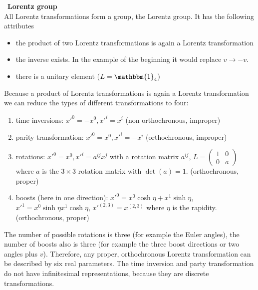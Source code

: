 \documentclass{include/thesisclass}
\newcommand{\df}{\rightarrow}
\newcommand{\ehm}{\mathbbm{1}}
\newcommand{\Matz}[4]{\begin{pmatrix}#1&#2\\#3&#4\end{pmatrix}}
\newcommand{\sub}[1]{~\newline\newline\textbf{#1}\\}
\begin{document}
\sub{Lorentz group}
All Lorentz transformations form a group, the Lorentz group. It has the following attributes
\begin{itemize}
\item the product of two Lorentz transformations is again a Lorentz transformation
\item the inverse exists. In the example of the beginning it would replace $v \df -v$.
\item there is a unitary element ($L = \ehm_4$)
\end{itemize}
Because a product of Lorentz transformations is again a Lorentz transformation we can reduce the types of different transformations to four:
\begin{enumerate}
\item time inversions: $x'^0 = - x^0, x'^i = x^i$ (non orthochronous, improper)
\item parity transformation: $x'^0 = x^0, x'^i = - x^i$ (orthochronous, improper)
\item rotations: $x'^0 = x^0, x'^i = a^{ij} x^j$ with a rotation matrix $a^{ij}$, $L = \Matz{1}{0}{0}{a}$ where $a$ is the $3\times 3$ rotation matrix with $\det(a) = 1$. (orthochronous, proper)
\item boosts (here in one direction): $x'^0 = x^0 \cosh \eta + x^1 \sinh \eta$, $x'^1 = x^0 \sinh\eta x^1 \cosh\eta$, $x'^{(2,3)} = x^{(2,3)}$ where $\eta$ is the rapidity. (orthochronous, proper)
\end{enumerate}
The number of possible rotations is three (for example the Euler angles), the number of boosts also is three (for example the three boost directions or two angles plus $v$). Therefore, any proper, orthochronous Lorentz transformation can be described by six real parameters. The time inversion and party transformation do not have infinitesimal representations, because they are discrete transformations.
\end{document}
